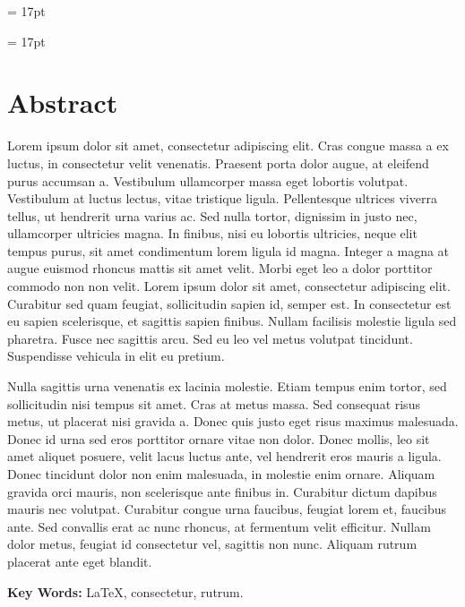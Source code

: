 \documentclass[11pt,oneside,openright]{book}
\begin{document}
\baselineskip = 17pt

\baselineskip = 17pt

\frontmatter

\tableofcontents
{}

\chapter{Abstract}

Lorem ipsum dolor sit amet, consectetur adipiscing elit. Cras congue massa a ex luctus, in consectetur velit venenatis. Praesent porta dolor augue, at eleifend purus accumsan a. Vestibulum ullamcorper massa eget lobortis volutpat. Vestibulum at luctus lectus, vitae tristique ligula. Pellentesque ultrices viverra tellus, ut hendrerit urna varius ac. Sed nulla tortor, dignissim in justo nec, ullamcorper ultricies magna. In finibus, nisi eu lobortis ultricies, neque elit tempus purus, sit amet condimentum lorem ligula id magna. Integer a magna at augue euismod rhoncus mattis sit amet velit. Morbi eget leo a dolor porttitor commodo non non velit. Lorem ipsum dolor sit amet, consectetur adipiscing elit. Curabitur sed quam feugiat, sollicitudin sapien id, semper est. In consectetur est eu sapien scelerisque, et sagittis sapien finibus. Nullam facilisis molestie ligula sed pharetra. Fusce nec sagittis arcu. Sed eu leo vel metus volutpat tincidunt. Suspendisse vehicula in elit eu pretium.

Nulla sagittis urna venenatis ex lacinia molestie. Etiam tempus enim tortor, sed sollicitudin nisi tempus sit amet. Cras at metus massa. Sed consequat risus metus, ut placerat nisi gravida a. Donec quis justo eget risus maximus malesuada. Donec id urna sed eros porttitor ornare vitae non dolor. Donec mollis, leo sit amet aliquet posuere, velit lacus luctus ante, vel hendrerit eros mauris a ligula. Donec tincidunt dolor non enim malesuada, in molestie enim ornare. Aliquam gravida orci mauris, non scelerisque ante finibus in. Curabitur dictum dapibus mauris nec volutpat. Curabitur congue urna faucibus, feugiat lorem et, faucibus ante. Sed convallis erat ac nunc rhoncus, at fermentum velit efficitur. Nullam dolor metus, feugiat id consectetur vel, sagittis non nunc. Aliquam rutrum placerat ante eget blandit.

\textbf{Key Words:} \LaTeX{}, consectetur, rutrum.

\mainmatter
\end{document}
